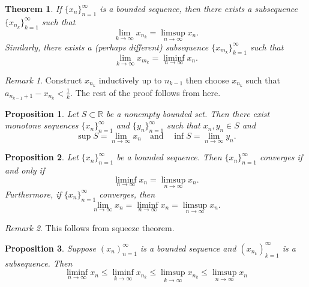 \documentclass{article}
\newtheorem{theorem}{Theorem}[section]
\newtheorem{proposition}{Proposition}[section]
\theoremstyle{definition}
\theoremstyle{remark}
\newtheorem{remark}{Remark}[section]
\begin{document}
\begin{theorem}\label{thm: lim sup lim inf subsequence}
If \( \{x_n\}_{n=1}^{\infty} \) is a bounded sequence, then there exists a subsequence \( \{x_{n_k}\}_{k=1}^{\infty} \) such that
\[
\lim_{k \to \infty} x_{n_k} = \limsup_{n \to \infty} x_n.
\]
Similarly, there exists a (perhaps different) subsequence \( \{x_{m_k}\}_{k=1}^{\infty} \) such that
\[
\lim_{k \to \infty} x_{m_k} = \liminf_{n \to \infty} x_n.
\]
\end{theorem}

\begin{remark}
Construct $x_{n_k}$ inductively up to $n_{k-1}$ then choose $x_{n_k}$
such that $a_{n_{k-1}+1} - x_{n_k} < \frac{1}{k}$. The rest of the proof
follows from here. 
\end{remark}





\begin{proposition}\label{ex: sup inf monotone sequence}
Let \( S \subset \mathbb{R} \) be a nonempty bounded set. Then there exist monotone sequences \( \{x_n\}_{n=1}^{\infty} \) and \( \{y_n\}_{n=1}^{\infty} \) such that \( x_n, y_n \in S \) and
\[
\sup S = \lim_{n \to \infty} x_n \quad \text{and} \quad \inf S = \lim_{n \to \infty} y_n.
\]
\end{proposition}








\begin{proposition} \label{prp: convergence criterion lim inf lim sup}
Let \( \{x_n\}_{n=1}^{\infty} \) be a bounded sequence. Then \( \{x_n\}_{n=1}^{\infty} \) converges if and only if
\[
\liminf_{n \to \infty} x_n = \limsup_{n \to \infty} x_n.
\]
\textit{Furthermore, if} \( \{x_n\}_{n=1}^{\infty} \) \textit{converges, then}
\[
\lim_{n \to \infty} x_n = \liminf_{n \to \infty} x_n = \limsup_{n \to \infty} x_n.
\]
\end{proposition}


\begin{remark}
This follows from squeeze theorem. 
\end{remark}





\begin{proposition}
Suppose $ (x_n)^\infty_{n=1}$ is a bounded sequence and $ (x_{n_k})^\infty_{k = 1}$ is a subsequence. Then
\[
\liminf_{n \to \infty} x_n \leq \liminf_{k \to \infty} x_{n_k} \leq \limsup_{k \to \infty} x_{n_k} \leq \limsup_{n \to \infty} x_n
\]
\end{proposition}
\end{document}
